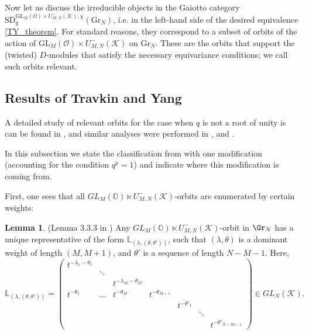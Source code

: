 \documentclass[12pt]{amsart}
\numberwithin{equation}{section}
\numberwithin{equation}{section}
\theoremstyle{definition}
\newtheorem{lemma}[theorem]{Lemma}
\begin{document}
Now let us discuss the irreducible objects in the Gaiotto category $\mathrm{SD}_q^{\mathrm{GL}_M(\mathcal{O}) \times U_{M,N}^{-}(\mathcal{K}), \chi}(\mathrm{Gr}_N)$, i.e. in the left-hand side of the desired equivalence \ref{TY_theorem}. For standard reasons, they correspond to a subset of orbits of the action of $\mathrm{GL}_M(\mathcal{O}) \times U_{M,N}^{-}(\mathcal{K})$ on $\mathrm{Gr}_N$. These are the orbits that support the (twisted) $D$-modules that satisfy the necessary equivariance conditions; we call such orbits relevant.


\subsection{Results of Travkin and Yang}

A detailed study of relevant orbits for the case when $q$ is not a root of unity is can be found in \cite{ty}, and similar analyses were performed in \cite{bft1}, \cite{bft2} and \cite{ty_untwisted}. 

In this subsection we state the classification from \cite{ty} with one modification (accounting for the condition $q^p=1$) and indicate where this modification is coming from. 

First, one sees that all $GL_M(\mathbb{O})\ltimes U_{M,N}^-(\mathcal{K})$-orbits are enumerated by certain weights:

\begin{lemma}\label{H orbit} (Lemma 3.3.3 in \cite{ty})
Any $GL_M(\mathbb{O})\ltimes U_{M,N}^-(\mathcal{K})$-orbit in $\Gr_N$ has a unique representative of the form $\mathbb{L}_{(\lambda,(\theta, \theta'))}$, such that $(\lambda,\theta)$ is a dominant weight of length $(M,M+1)$, and $\theta'$ is a sequence of length $N-M-1$. Here,
\begin{equation}
    \mathbb{L}_{(\lambda,(\theta, \theta'))}=\begin{pmatrix}
    t^{-\lambda_1-\theta_1}       &   &  &  &&&\\
    &\ddots&& &&&\\
          & &   t^{-\lambda_M-\theta_M} &&&& \\
         t^{-\theta_1}  &\dots&  t^{-\theta_M} & t^{-\theta_{M+1}}&&&\\
         &&&&t^{-\theta'_1}&&\\
         &&&&&\ddots&\\
         &&&&&&t^{-\theta'_{N-M-1}}
\end{pmatrix}\in GL_{N}(\mathcal{K}).
\end{equation}
\end{lemma}
\end{document}
